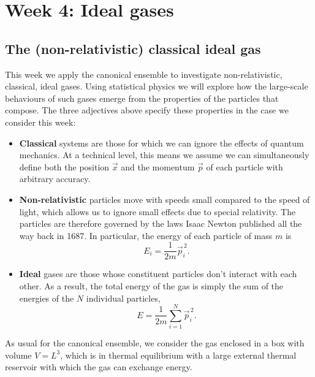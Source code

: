 \renewcommand{\thisweek}{MATH327 Week 4}
\renewcommand{\moddate}{Last modified 18 Feb.~2021}
\setcounter{section}{4}
\setcounter{subsection}{0}
{}
\section*{Week 4: Ideal gases}

\subsection{The (non-relativistic) classical ideal gas}
This week we apply the canonical ensemble to investigate non-relativistic, classical, ideal gases.
Using statistical physics we will explore how the large-scale behaviours of such gases emerge from the properties of the particles that compose.
The three adjectives above specify these properties in the case we consider this week: \\[-24 pt]
\begin{itemize}
  \item \textbf{Classical} systems are those for which we can ignore the effects of quantum mechanics.
        At a technical level, this means we assume we can simultaneously define both the position $\vec x$ and the momentum $\vec p$ of each particle with arbitrary accuracy.
  \item \textbf{Non-relativistic} particles move with speeds small compared to the speed of light, which allows us to ignore small effects due to special relativity.
        The particles are therefore governed by the laws Isaac Newton published all the way back in 1687.
        In particular, the energy of each particle of mass $m$ is
        \begin{equation*}
          E_i = \frac{1}{2m} \vec{p}_i^{\,2}.
        \end{equation*}
  \item \textbf{Ideal} gases are those whose constituent particles don't interact with each other.
        As a result, the total energy of the gas is simply the sum of the energies of the $N$ individual particles,
        \begin{equation}
          E = \frac{1}{2m} \sum_{i = 1}^N \vec{p}_i^{\,2}.
        \end{equation}
\end{itemize}

As usual for the canonical ensemble, we consider the gas enclosed in a box with volume $V = L^3$, which is in thermal equilibrium with a large external thermal reservoir with which the gas can exchange energy.


